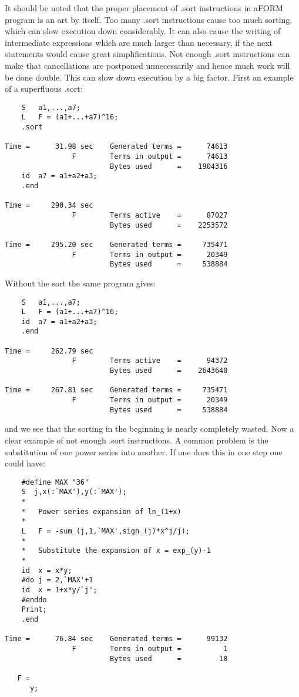 It should be noted that the proper placement of .sort 
instructions in aFORM program is an art by itself. Too many .sort 
instructions cause too much sorting, which can slow execution down 
considerably. It can also cause the writing of intermediate expressions 
which are much larger than necessary, if the next statements would cause 
great simplifications. Not enough .sort instructions can make that 
cancellations are postponed unnecessarily and hence much work will be done 
double. This can slow down execution by a big factor. First an example of a 
superfluous .sort:
\begin{verbatim}
    S	a1,...,a7;
    L	F = (a1+...+a7)^16;
    .sort

Time =      31.98 sec    Generated terms =      74613
                F        Terms in output =      74613
                         Bytes used      =    1904316
    id	a7 = a1+a2+a3;
    .end

Time =     290.34 sec
                F        Terms active    =      87027
                         Bytes used      =    2253572

Time =     295.20 sec    Generated terms =     735471
                F        Terms in output =      20349
                         Bytes used      =     538884
\end{verbatim}
Without the sort the same program gives:
\begin{verbatim}
    S	a1,...,a7;
    L	F = (a1+...+a7)^16;
    id	a7 = a1+a2+a3;
    .end

Time =     262.79 sec
                F        Terms active    =      94372
                         Bytes used      =    2643640

Time =     267.81 sec    Generated terms =     735471
                F        Terms in output =      20349
                         Bytes used      =     538884
\end{verbatim}
and we see that the sorting in the beginning is nearly completely wasted. 
Now a clear example of not enough .sort instructions. A common problem is 
the substitution of one power series into another. If 
one does this in one step one could have:
\begin{verbatim}
    #define MAX "36"
    S  j,x(:`MAX'),y(:`MAX');
    *
    *	Power series expansion of ln_(1+x)
    *
    L	F = -sum_(j,1,`MAX',sign_(j)*x^j/j);
    *
    *	Substitute the expansion of x = exp_(y)-1
    *
    id	x = x*y;
    #do j = 2,`MAX'+1
    id	x = 1+x*y/`j';
    #enddo
    Print;
    .end

Time =      76.84 sec    Generated terms =      99132
                F        Terms in output =          1
                         Bytes used      =         18

   F =
      y;
\end{verbatim}
